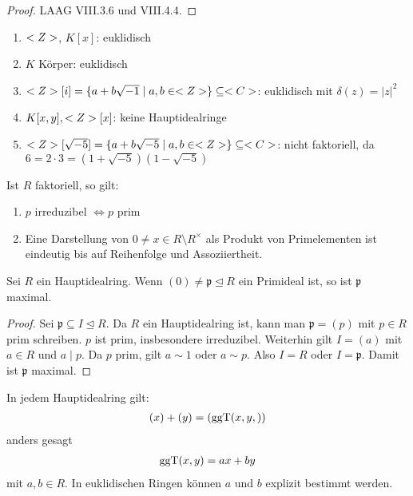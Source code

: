 \begin{proof}
	LAAG VIII.3.6 und VIII.4.4.
\end{proof}

\begin{example}
	\begin{enumerate}[label=(\alph*)]
		\item $<Z>$, $K[x]$: euklidisch
		\item $K$ Körper: euklidisch
		\item $<Z>[i] = \{ a+b\sqrt{-1} \mid a,b \in <Z> \} \subseteq <C>$: euklidisch mit $\delta(z) = \vert z \vert^2$
		\item $K[x,y], <Z>[x]$: keine Hauptidealringe
		\item $<Z>[\sqrt{-5}] = \{ a+b\sqrt{-5} \mid a,b \in <Z> \} \subseteq <C>$: nicht faktoriell, da $6 = 2\cdot 3 = (1 + \sqrt{-5})(1-\sqrt{-5})$
	\end{enumerate}
\end{example}

\begin{remark}
	Ist $R$ faktoriell, so gilt:
	\begin{enumerate}[label=(\alph*)]
		\item $p$ irreduzibel $\Leftrightarrow p$ prim
		\item Eine Darstellung von $0 \neq x \in R \setminus R^{\times}$ als Produkt von Primelementen ist eindeutig bis auf Reihenfolge und Assoziiertheit.
	\end{enumerate}
\end{remark}

\begin{proposition}
	Sei $R$ ein Hauptidealring. Wenn $(0) \neq \mathfrak{p} \unlhd R$ ein Primideal ist, so ist $\mathfrak{p}$ maximal.
\end{proposition}

\begin{proof}
	Sei $\mathfrak{p} \subseteq I \unlhd R$. Da $R$ ein Hauptidealring ist, kann man $\mathfrak{p} = (p)$ mit $p \in R$ prim schreiben. $p$ ist prim, insbesondere irreduzibel. Weiterhin gilt $I = (a)$ mit $a \in R$ und $a \mid p$. Da $p$ prim, gilt $a \sim 1$ oder $a \sim p$. Also $I = R$ oder $I = \mathfrak{p}$. Damit ist $\mathfrak{p}$ maximal.
\end{proof}

\begin{remark}
	In jedem Hauptidealring gilt:
	\begin{align}
		(x) + (y) = (\operatorname{ggT}(x,y,)) \notag
	\end{align}
	anders gesagt
	\begin{align}
		\operatorname{ggT}(x,y) = ax + by \notag
	\end{align}
	mit $a,b \in R$. In euklidischen Ringen können $a$ und $b$ explizit bestimmt werden.
\end{remark}

